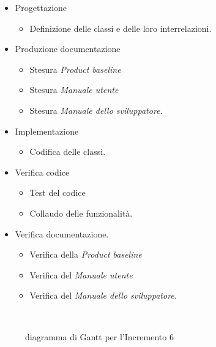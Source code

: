 \documentclass[../piano-di-progetto.tex]{subfiles}
\begin{document}
\begin{itemize}
  \item Progettazione
  \begin{itemize}
    \item Definizione delle classi e delle loro interrelazioni.
  \end{itemize}
  \item Produzione documentazione
  \begin{itemize}
    \item Stesura \textit{Product baseline}
    \item Stesura \textit{Manuale utente}
    \item Stesura \textit{Manuale dello sviluppatore}.
  \end{itemize}
  \item Implementazione
  \begin{itemize}
    \item Codifica delle classi.
  \end{itemize}
  \item Verifica codice
  \begin{itemize}
    \item Test del codice
    \item Collaudo delle funzionalità.
  \end{itemize}
  \item Verifica documentazione.
  \begin{itemize}
    \item Verifica della \textit{Product baseline}
    \item Verifica del \textit{Manuale utente}
    \item Verifica del \textit{Manuale dello sviluppatore}.
  \end{itemize}
\end{itemize}
\begin{figure}[H]
  \centering
  
  \caption{diagramma di Gantt per l'Incremento 6}%
~~\label{fig:gantt_incremento_6}
\end{figure}
\end{document}

